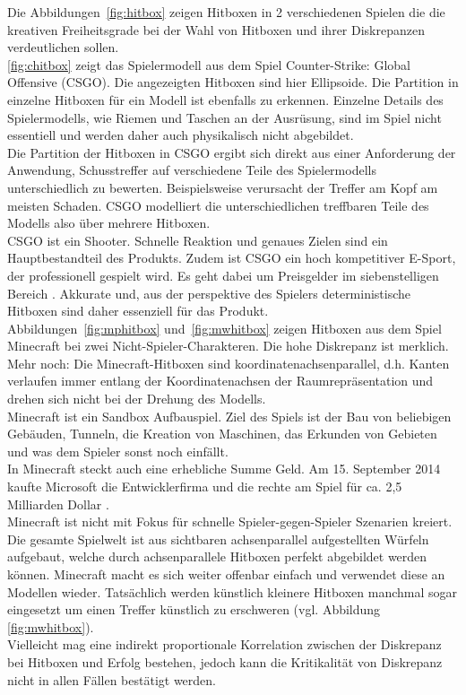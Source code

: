 Die Abbildungen~\ref{fig:hitbox} zeigen Hitboxen in 2 verschiedenen Spielen die die kreativen Freiheitsgrade bei der Wahl von Hitboxen und ihrer Diskrepanzen verdeutlichen sollen.\\
\ref{fig:chitbox} zeigt das Spielermodell aus dem Spiel Counter-Strike: Global Offensive (CSGO). Die angezeigten Hitboxen sind hier Ellipsoide.
Die Partition in einzelne Hitboxen für ein Modell ist ebenfalls zu erkennen.
Einzelne Details des Spielermodells, wie Riemen und Taschen an der Ausrüsung, sind im Spiel nicht essentiell und werden daher auch physikalisch nicht abgebildet.\\
Die Partition der Hitboxen in CSGO ergibt sich direkt aus einer Anforderung der Anwendung, Schusstreffer auf verschiedene Teile des Spielermodells unterschiedlich zu bewerten. Beispielsweise verursacht der Treffer am Kopf am meisten Schaden. CSGO modelliert die unterschiedlichen treffbaren Teile des Modells also über mehrere Hitboxen.\\
CSGO ist ein Shooter. Schnelle Reaktion und genaues Zielen sind ein Hauptbestandteil des Produkts. Zudem ist CSGO ein hoch kompetitiver E-Sport, der professionell gespielt wird. Es geht dabei um Preisgelder im siebenstelligen Bereich \cite{csgoprice}. Akkurate und, aus der perspektive des Spielers deterministische Hitboxen sind daher essenziell für das Produkt.\\
Abbildungen~\ref{fig:mphitbox} und~\ref{fig:mwhitbox} zeigen Hitboxen aus dem Spiel Minecraft bei zwei Nicht-Spieler-Charakteren. Die hohe Diskrepanz ist merklich. Mehr noch: Die Minecraft-Hitboxen sind koordinatenachsenparallel, d.h. Kanten verlaufen immer entlang der Koordinatenachsen der Raumrepräsentation und drehen sich nicht bei der Drehung des Modells.\\
Minecraft ist ein Sandbox Aufbauspiel. Ziel des Spiels ist der Bau von beliebigen Gebäuden, Tunneln, die Kreation von Maschinen, das Erkunden von Gebieten und was dem Spieler sonst noch einfällt.\\
In Minecraft steckt auch eine erhebliche Summe Geld. Am 15. September 2014 kaufte Microsoft die Entwicklerfirma und die rechte am Spiel für ca. 2,5 Milliarden Dollar \cite{buyminecraft}.\\
Minecraft ist nicht mit Fokus für schnelle Spieler-gegen-Spieler Szenarien kreiert. Die gesamte Spielwelt ist aus sichtbaren achsenparallel aufgestellten Würfeln aufgebaut, welche durch achsenparallele Hitboxen perfekt abgebildet werden können. Minecraft macht es sich weiter offenbar einfach und verwendet diese an Modellen wieder. Tatsächlich werden künstlich kleinere Hitboxen manchmal sogar eingesetzt um einen Treffer künstlich zu erschweren (vgl. Abbildung \ref{fig:mwhitbox}).\\
Vielleicht mag eine indirekt proportionale Korrelation zwischen der Diskrepanz bei Hitboxen und Erfolg bestehen, jedoch kann die Kritikalität von Diskrepanz nicht in allen Fällen bestätigt werden.
